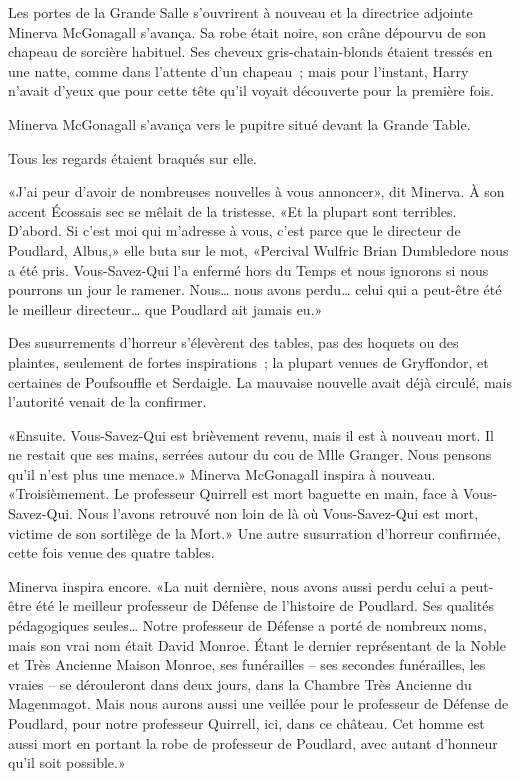 Les portes de la Grande Salle s'ouvrirent à nouveau et la directrice adjointe Minerva McGonagall s'avança. Sa robe était noire, son crâne dépourvu de son chapeau de sorcière habituel. Ses cheveux gris-chatain-blonds étaient tressés en une natte, comme dans l'attente d'un chapeau~; mais pour l'instant, Harry n'avait d'yeux que pour cette tête qu'il voyait découverte pour la première fois.

Minerva McGonagall s'avança vers le pupitre situé devant la Grande Table.

Tous les regards étaient braqués sur elle.

«J'ai peur d'avoir de nombreuses nouvelles à vous annoncer», dit Minerva. À son accent Écossais sec se mêlait de la tristesse. «Et la plupart sont terribles. D'abord. Si c'est moi qui m'adresse à vous, c'est parce que le directeur de Poudlard, Albus,» elle buta sur le mot, «Percival Wulfric Brian Dumbledore nous a été pris. Vous-Savez-Qui l'a enfermé hors du Temps et nous ignorons si nous pourrons un jour le ramener. Nous… nous avons perdu… celui qui a peut-être été le meilleur directeur… que Poudlard ait jamais eu.»

Des susurrements d'horreur s'élevèrent des tables, pas des hoquets ou des plaintes, seulement de fortes inspirations~; la plupart venues de Gryffondor, et certaines de Poufsouffle et Serdaigle. La mauvaise nouvelle avait déjà circulé, mais l'autorité venait de la confirmer.

«Ensuite. Vous-Savez-Qui est brièvement revenu, mais il est à nouveau mort. Il ne restait que ses mains, serrées autour du cou de Mlle Granger. Nous pensons qu'il n'est plus une menace.» Minerva McGonagall inspira à nouveau. «Troisièmement. Le professeur Quirrell est mort baguette en main, face à Vous-Savez-Qui. Nous l'avons retrouvé non loin de là où Vous-Savez-Qui est mort, victime de son sortilège de la Mort.» Une autre susurration d'horreur confirmée, cette fois venue des quatre tables.

Minerva inspira encore. «La nuit dernière, nous avons aussi perdu celui a peut-être été le meilleur professeur de Défense de l'histoire de Poudlard. Ses qualités pédagogiques seules… Notre professeur de Défense a porté de nombreux noms, mais son vrai nom était David Monroe. Étant le dernier représentant de la Noble et Très Ancienne Maison Monroe, ses funérailles -- ses secondes funérailles, les vraies -- se dérouleront dans deux jours, dans la Chambre Très Ancienne du Magenmagot. Mais nous aurons aussi une veillée pour le professeur de Défense de Poudlard, pour notre professeur Quirrell, ici, dans ce château. Cet homme est aussi mort en portant la robe de professeur de Poudlard, avec autant d'honneur qu'il soit possible.»

